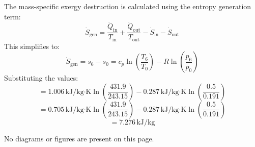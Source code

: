 The mass-specific exergy destruction is calculated using the entropy generation term:  
\[
\dot{S}_{\text{gen}} = \frac{\dot{Q}_{\text{in}}}{T_{\text{in}}} + \frac{\dot{Q}_{\text{out}}}{T_{\text{out}}} - \dot{S}_{\text{in}} - \dot{S}_{\text{out}}
\]  
This simplifies to:  
\[
\dot{S}_{\text{gen}} = s_6 - s_0 = c_p \ln \left( \frac{T_6}{T_0} \right) - R \ln \left( \frac{p_6}{p_0} \right)
\]  
Substituting the values:  
\[
= 1.006 \, \text{kJ/kg·K} \ln \left( \frac{431.9}{243.15} \right) - 0.287 \, \text{kJ/kg·K} \ln \left( \frac{0.5}{0.191} \right)
\]  
\[
= 0.705 \, \text{kJ/kg·K} \ln \left( \frac{431.9}{243.15} \right) - 0.287 \, \text{kJ/kg·K} \ln \left( \frac{0.5}{0.191} \right)
\]  
\[
= 7.276 \, \text{kJ/kg}
\]  

No diagrams or figures are present on this page.